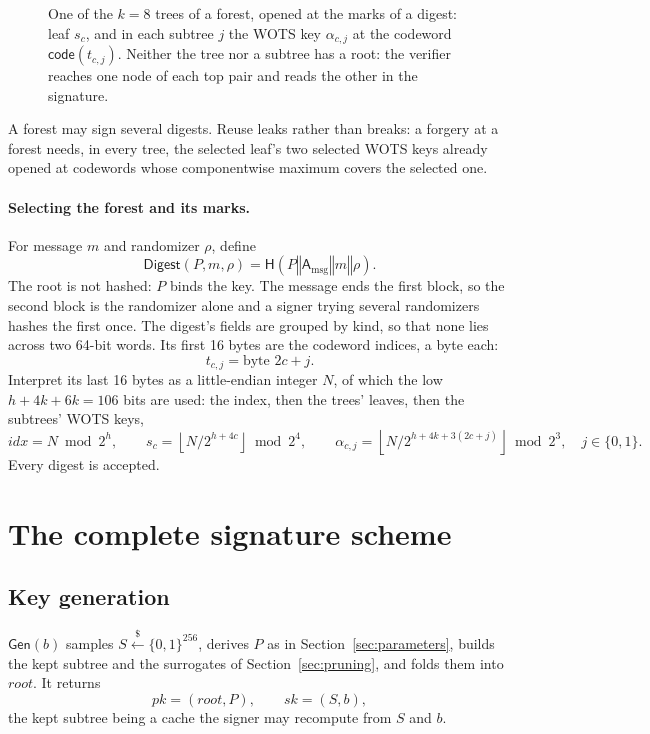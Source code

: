 \documentclass[11pt]{article}
\theoremstyle{plain}
\theoremstyle{definition}
\newcommand{\bits}[1]{\{0,1\}^{#1}}
\newcommand{\getsr}{\stackrel{\$}{\gets}}
\newcommand{\Digest}{\mathsf{Digest}}
\newcommand{\Gen}{\mathsf{Gen}}
\newcommand{\hash}{\mathsf{H}}
\newcommand{\concat}{\mathbin\Vert}
\newcommand{\sk}{\mathit{sk}}
\newcommand{\pk}{\mathit{pk}}
\newcommand{\rootnode}{\mathit{root}}
\newcommand{\addr}{\mathsf{A}}
\newcommand{\idx}{\mathit{idx}}
\newcommand{\lut}{\mathsf{code}}
\begin{document}
\begin{figure}[t]
\caption{One of the $k=8$ trees of a forest, opened at the marks of a digest: leaf $s_c$, and in each subtree $j$ the WOTS key $\alpha_{c,j}$ at the codeword $\lut(t_{c,j})$. Neither the tree nor a subtree has a root: the verifier reaches one node of each top pair and reads the other in the signature.}
\label{fig:forest}
\end{figure}

A forest may sign several digests. Reuse leaks rather than breaks: a forgery at a forest needs, in every tree, the selected leaf's two selected WOTS keys already opened at codewords whose componentwise maximum covers the selected one.

\paragraph{Selecting the forest and its marks.}
\label{rem:rho}
For message $m$ and randomizer $\rho$, define
\[
  \Digest(P,m,\rho)=\hash(P\concat\addr_{\mathrm{msg}}\concat m\concat\rho).
\]
The root is not hashed: $P$ binds the key. The message ends the first block, so the second block is the randomizer alone and a signer trying several randomizers hashes the first once. The digest's fields are grouped by kind, so that none lies across two 64-bit words. Its first 16 bytes are the codeword indices, a byte each:
\[
  t_{c,j}=\text{byte }2c+j.
\]
Interpret its last 16 bytes as a little-endian integer $N$, of which the low $h+4k+6k=106$ bits are used: the index, then the trees' leaves, then the subtrees' WOTS keys,
\[
  \idx=N\bmod2^h,\qquad
  s_c=\left\lfloor N/2^{h+4c}\right\rfloor\bmod2^4,\qquad
  \alpha_{c,j}=\left\lfloor N/2^{h+4k+3(2c+j)}\right\rfloor\bmod2^3,
  \quad j\in\{0,1\}.
\]
Every digest is accepted.

\section{The complete signature scheme}

\subsection{Key generation}
\label{rem:seed}

$\Gen(b)$ samples $S\getsr\bits{256}$, derives $P$ as in Section~\ref{sec:parameters}, builds the kept subtree and the surrogates of Section~\ref{sec:pruning}, and folds them into $\rootnode$. It returns
\[
  \pk=(\rootnode,P),\qquad \sk=(S,b),
\]
the kept subtree being a cache the signer may recompute from $S$ and $b$.
\end{document}
